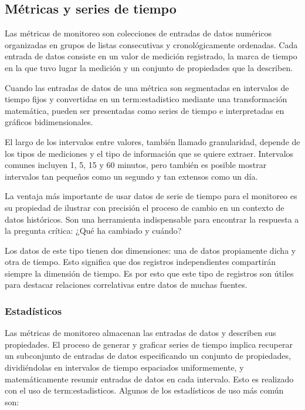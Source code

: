 \subsection{Métricas y series de tiempo}
\label{metricas-y-timeseries}

Las métricas de monitoreo son colecciones de entradas de datos numéricos
organizadas en grupos de listas consecutivas y cronológicamente ordenadas. Cada
entrada de datos consiste en un valor de medición registrado, la marca de
tiempo en la que tuvo lugar la medición y un conjunto de propiedades que la
describen.

Cuando las entradas de datos de una métrica son segmentadas en intervalos de
tiempo fijos y convertidas en un \gls{term:estadistico} mediante una transformación
matemática, pueden ser presentadas como series de tiempo e interpretadas en
gráficos bidimensionales.

El largo de los intervalos entre valores, también llamado granularidad, depende
de los tipos de mediciones y el tipo de información que se quiere extraer.
Intervalos comunes incluyen 1, 5, 15 y 60 minutos, pero también es posible
mostrar intervalos tan pequeños como un segundo y tan extensos como un día.

La ventaja más importante de usar datos de serie de tiempo para el monitoreo es
su propiedad de ilustrar con precisión el proceso de cambio en un contexto de
datos históricos. Son una herramienta indispensable para encontrar la respuesta
a la pregunta crítica: ¿Qué ha cambiado y cuándo?

Los datos de este tipo tienen dos dimensiones: una de datos propiamente dicha y
otra de tiempo. Esto significa que dos registros independientes compartirán
siempre la dimensión de tiempo. Es por esto que este tipo de registros son
útiles para destacar relaciones correlativas entre datos de muchas fuentes.

\subsubsection*{Estadísticos}
\label{estadisticos}

Las métricas de monitoreo almacenan las entradas de datos y describen sus
propiedades. El proceso de generar y graficar series de tiempo implica
recuperar un subconjunto de entradas de datos especificando un conjunto de
propiedades, dividiéndolas en intervalos de tiempo espaciados uniformemente, y
matemáticamente resumir entradas de datos en cada intervalo. Esto es realizado
con el uso de \glspl{term:estadistico}. Algunos de los estadísticos de uso más
común son:

